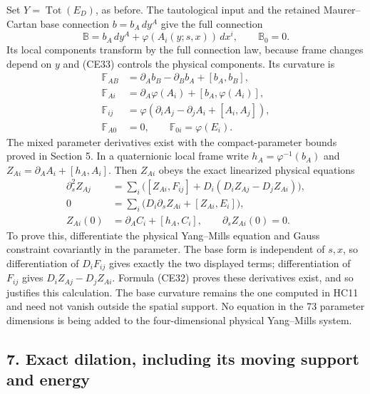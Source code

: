 \documentclass[11pt]{article}
\begin{document}
Set \(Y=\operatorname{Tot}(E_D)\), as before. The tautological input
and the retained Maurer–Cartan base connection \(b=b_A\,dy^A\)
give the full connection
\[
 \mathbb B=b_A\,dy^A+\varphi(A_i(y;s,x))\,dx^i,\qquad \mathbb B_0=0.
 \tag{CE35}
\]
Its local components transform by the full connection law, because
frame changes depend on \(y\) and (CE33) controls the physical components.
Its curvature is
\[
 \begin{aligned}
 \mathbb F_{AB}&=\partial_Ab_B-\partial_Bb_A+[b_A,b_B],\\
 \mathbb F_{Ai}&=\partial_A\varphi(A_i)+[b_A,\varphi(A_i)],\\
 \mathbb F_{ij}&=\varphi(\partial_iA_j-\partial_jA_i+[A_i,A_j]),\\
 \mathbb F_{A0}&=0,\qquad \mathbb F_{0i}=\varphi(E_i).
 \end{aligned}\tag{CE36}
\]
The mixed parameter derivatives exist with the compact-parameter bounds
proved in Section 5. In a quaternionic local frame write
\(h_A=\varphi^{-1}(b_A)\) and
\(Z_{A i}=\partial_AA_i+[h_A,A_i]\).
Then \(Z_{A i}\) obeys the exact linearized physical equations
\[
 \begin{aligned}
 \partial_s^2 Z_{A j}
 &=\sum_i\bigl([Z_{A i},F_{ij}]
       +D_i(D_iZ_{A j}-D_jZ_{A i})\bigr),\\
 0&=\sum_i\bigl(D_i\partial_sZ_{A i}+[Z_{A i},E_i]\bigr),\\
 Z_{A i}(0)&=\partial_AC_i+[h_A,C_i],\qquad
 \partial_sZ_{A i}(0)=0.
 \end{aligned}\tag{CE37}
\]
To prove this, differentiate the physical Yang–Mills equation and Gauss
constraint covariantly in the parameter. The base form is independent
of \(s,x\), so differentiation of \(D_iF_{ij}\) gives exactly the two
displayed terms; differentiation of \(F_{ij}\) gives
\(D_iZ_{A j}-D_jZ_{A i}\). Formula (CE32) proves these derivatives
exist, and so justifies this calculation. The base curvature remains
the one computed in HC11 and need not vanish outside the spatial
support. No equation in the 73 parameter dimensions is being added
to the four-dimensional physical Yang–Mills system.

\subsection*{7. Exact dilation, including its moving support and energy}
\end{document}
